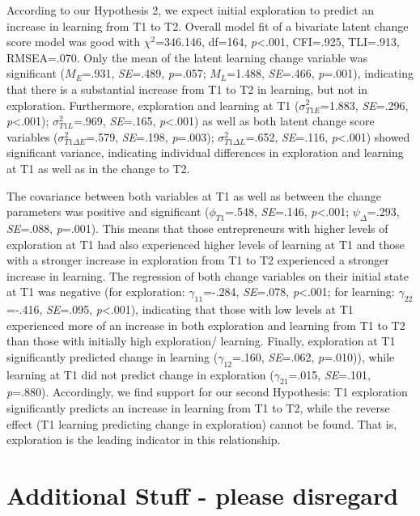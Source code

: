 \documentclass[man]{apa7}
\begin{document}
According to our Hypothesis 2, we expect initial exploration to predict an increase in learning from T1 to T2. 
Overall model fit of a bivariate latent change score model was good with $\chi^2$=346.146, df=164, \textit{p}<.001, CFI=.925, TLI=.913, RMSEA=.070. 
Only the mean of the latent learning change variable was significant ($\textit{M}_E$=.931, \textit{SE}=.489, \textit{p}=.057; $\textit{M}_L$=1.488, \textit{SE}=.466, \textit{p}=.001), indicating that there is a substantial increase from T1 to T2 in learning, but not in exploration. 
Furthermore, exploration and learning at T1 ($\sigma^2_{T1E}$=1.883, \textit{SE}=.296, \textit{p}<.001); $\sigma^2_{T1L}$=.969, \textit{SE}=.165, \textit{p}<.001) as well as both latent change score variables ($\sigma^2_{T1\Delta E}$=.579, \textit{SE}=.198, \textit{p}=.003); $\sigma^2_{T1\Delta L}$=.652, \textit{SE}=.116, \textit{p}<.001) showed significant variance, indicating individual differences in exploration and learning at T1 as well as in the change to T2. \par 
The covariance between both variables at T1 as well as between the change parameters was positive and significant ($\phi_{T1}$=.548, \textit{SE}=.146, \textit{p}<.001; $\psi_{\Delta}$=.293, \textit{SE}=.088, \textit{p}=.001). 
This means that those entrepreneurs with higher levels of exploration at T1 had also experienced higher levels of learning at T1 and those with a stronger increase in exploration from T1 to T2 experienced a stronger increase in learning. 
The regression of both change variables on their initial state at T1 was negative (for exploration: $\gamma_{11}$=-.284, \textit{SE}=.078, \textit{p}<.001; for learning: $\gamma_{22}$=-.416, \textit{SE}=.095, \textit{p}<.001), indicating that those with low levels at T1 experienced more of an increase in both exploration and learning from T1 to T2 than those with initially high exploration/ learning. 
Finally, exploration at T1 significantly predicted change in learning ($\gamma_{12}$=.160, \textit{SE}=.062, \textit{p}=.010)), while learning at T1 did not predict change in exploration ($\gamma_{21}$=.015, \textit{SE}=.101, \textit{p}=.880). 
Accordingly, we find support for our second Hypothesis: T1 exploration significantly predicts an increase in learning from T1 to T2, while the reverse effect (T1 learning predicting change in exploration) cannot be found. 
That is, exploration is the leading indicator in this relationship. 




\section{Additional Stuff - please disregard}
\end{document}
